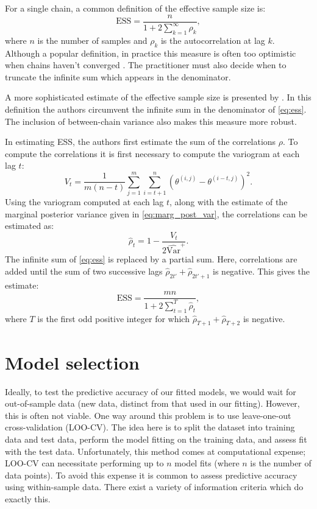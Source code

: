 For a single chain, a common definition of the effective sample size is:
\begin{equation}
    \label{eq:ess}
    \text{ESS} = \frac{n}{1 + 2 \sum_{k=1}^\infty \rho_k},
\end{equation}
where $n$ is the number of samples and $\rho_k$ is the autocorrelation at lag
$k$. Although a popular definition, in practice this measure is often too
optimistic when chains haven't converged \parencite{gelman13}. The practitioner
must also decide when to truncate the infinite sum which appears in the
denominator.

A more sophisticated estimate of the effective sample size is presented by
\textcite{gelman13}. In this definition the authors circumvent the infinite sum
in the denominator of \cref{eq:ess}. The inclusion of between-chain variance
also makes this measure more robust.

In estimating ESS, the authors first estimate the sum of the correlations
$\rho$. To compute the correlations it is first necessary to compute the
variogram at each lag $t$:
\begin{equation*}
    V_t = \frac{1}{m(n-t)} \sum_{j=1}^m \sum_{i=t+1}^{n} (\theta^{(i, j)} -
    \theta^{(i-t,j)})^2.
\end{equation*}
Using the variogram computed at each lag $t$, along with the estimate of the
marginal posterior variance given in \cref{eq:marg_post_var}, the correlations
can be estimated as:
\begin{equation*}
  \widehat{\rho}_t = 1 - \frac{V_t}{2\widehat{\text{Var}}^+}.
\end{equation*}
The infinite sum of \cref{eq:ess} is replaced by a partial sum. Here,
correlations are added until the sum of two successive lags
$\widehat{\rho}_{2t'} + \widehat{\rho}_{2t'+1}$ is negative. This gives the
estimate:
\begin{equation*}
  \text{ESS} = \frac{mn}{1+ 2\sum_{t=1}^{T}\widehat{\rho}_t},
\end{equation*}
where $T$ is the first odd positive integer for which $\widehat{\rho}_{T+1} +
\widehat{\rho}_{T+2}$ is negative.

\section{Model selection}
\label{sec:model_comparison}

Ideally, to test the predictive accuracy of our fitted models, we would wait
for out-of-sample data (new data, distinct from that used in our fitting).
However, this is often not viable. One way around this problem is to use
leave-one-out cross-validation (LOO-CV). The idea here is to split the dataset
into training data and test data, perform the model fitting on the training
data, and assess fit with the test data. Unfortunately, this method comes at
computational expense; LOO-CV can necessitate performing up to $n$ model fits
(where $n$ is the number of data points). To avoid this expense it is common to
assess predictive accuracy using within-sample data. There exist a variety of
information criteria which do exactly this.

